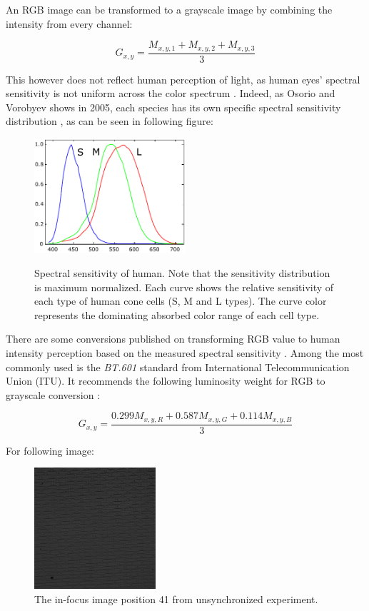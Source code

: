 \documentclass[pdftex,12pt,a4paper]{report}
\begin{document}
An RGB image can be transformed to a grayscale image by combining the intensity from every channel:

$$
G_{x, y} = \frac{M_{x, y, 1} + M_{x, y, 2} + M_{x, y, 3}}{3}
$$

This however does not reflect human perception of light, as human eyes' spectral sensitivity is not uniform across the color spectrum \cite{wyszecki1982color}. Indeed, as Osorio and Vorobyev shows in 2005, each species has its own specific spectral sensitivity distribution \cite{osorio2005photoreceptor}, as can be seen in following figure:

\begin{figure}[H]
\centering
\includegraphics[width=0.5\textwidth]{images/spectral_sensitivity_human.pdf}
\label{fig:spectral_sensitivity}
\caption[Spectral sensitivity of human]{Spectral sensitivity of human. Note that the sensitivity distribution is maximum normalized. Each curve shows the relative sensitivity of each type of human cone cells (S, M and L types). The curve color represents the dominating absorbed color range of each cell type.}
\end{figure}

There are some conversions published on transforming RGB value to human intensity perception based on the measured spectral sensitivity \cite{anderson1996proposal, itu2007studio, itu2015parameter}. Among the most commonly used is the \textit{BT.601} standard from International Telecommunication Union (ITU). It recommends the following luminosity weight for RGB to grayscale conversion \cite{itu2007studio}:

\begin{equation}
G_{x, y} = \frac{0.299 M_{x, y, R} + 0.587  M_{x, y, G} + 0.114 M_{x, y, B}}{3}
\label{equation:rgb_to_gray_def}
\end{equation}

For following image: 

\begin{figure}[H]
\centering
\includegraphics[width=0.4\textwidth]{images/pos_41_in_t0}
\caption{The in-focus image position 41 from unsynchronized experiment.}
\label{fig:pos41}
\end{figure}
\end{document}
